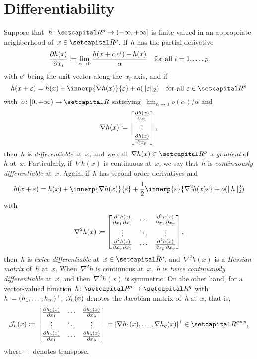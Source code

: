 \documentclass[../main]{subfiles}
\begin{document}
\section{Differentiability}
Suppose that~$h \colon \setR^p \to (-\infty, +\infty]$ is finite-valued in an appropriate neighborhood of~$x \in \setR^p$.
If~$h$ has the partial derivative
\[ \label{eq:pdv}
    \pdv{h(x)}{x_i} \coloneqq \lim_{\alpha \to 0} \frac{h(x + \alpha e^i) - h(x)}{\alpha} \quad \text{for all~$i = 1, \dots, p$}
\] 
with $e^i$ being the unit vector along the~$x_i$-axis, and if
\[
    h(x + \varepsilon) = h(x) + \innerp{\nabla h(x)}{\varepsilon} + o(\norm{\varepsilon}_2) \forallcondition{\varepsilon \in \setR^p}
\] 
with~$o \colon [0, +\infty) \to \setR$ satisfying~$\lim_{\alpha \to 0} o(\alpha) / \alpha$ and
\[ \label{eq:grad}
    \nabla h(x) \coloneqq 
    \begin{bmatrix} 
        \pdv{h(x)}{x_1} \\ \vdots \\ \pdv{h(x)}{x_p} 
    \end{bmatrix}
,\] 
then~$h$ is \emph{differentiable} at~$x$, and we call~$\nabla h(x) \in \setR^p$ a \emph{gradient} of~$h$ at~$x$.
Particularly, if~$\nabla h(x)$ is continuous at~$x$, we say that~$h$ is \emph{continuously differentiable} at~$x$.
Again, if~$h$ has second-order derivatives and
\[
    h(x + \varepsilon) = h(x) + \innerp{\nabla h(x)}{\varepsilon} + \frac{1}{2} \innerp{\varepsilon}{\nabla^2 h(x) \varepsilon} + o(\norm{h}_2^2)
\] 
with
\[ \label{eq:hess}
    \nabla^2 h(x) \coloneqq
    \begin{bmatrix} 
        \pdv{h(x)}{x_1,x_1} & \cdots & \pdv{h(x)}{x_1,x_p} \\
        \vdots & \ddots & \vdots \\
        \pdv{h(x)}{x_p,x_1} & \cdots & \pdv{h(x)}{x_p,x_p} \\
    \end{bmatrix} 
,\] 
then~$h$ is \emph{twice differentiable} at~$x \in \setR^p$, and~$\nabla^2 h(x)$ is a \emph{Hessian matrix} of~$h$ at~$x$.
When~$\nabla^2 h$ is continuous at~$x$,~$h$ is \emph{twice continuously differentiable} at~$x$, and then~$\nabla^2 h(x)$ is symmetric.
On the other hand, for a vector-valued function~$h \colon \setR^p \to \setR^q$ with~$h \coloneqq (h_1, \dots, h_m)^\top\hspace{-1pt}$,~$\mathcal{J}_{h}(x)$ denotes the Jacobian matrix of~$h$ at~$x$, that is,
\[ \label{eq:jac}
    \jdv{h}{x} \coloneqq
    \begin{bmatrix}
        \pdv{h_1(x)}{x_1} & \cdots & \pdv{h_1(x)}{x_p} \\
        \vdots & \ddots & \vdots \\
        \pdv{h_q(x)}{x_1} & \cdots & \pdv{h_q(x)}{x_p}
    \end{bmatrix} 
    = [ \nabla h_1(x), \dots, \nabla h_q(x) ]^\T \in \setR^{q \times p}
,\] 
where~$\top\hspace{-1pt}$ denotes transpose.
\end{document}
